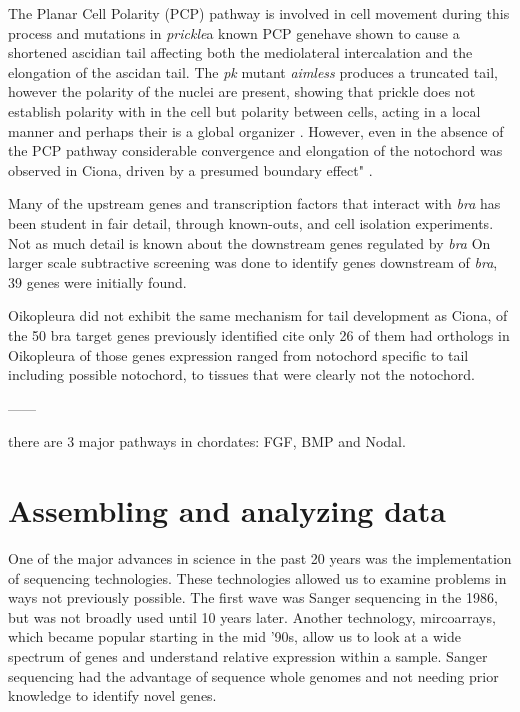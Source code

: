 The Planar Cell Polarity (PCP) pathway is involved in cell movement during this process and mutations in \textit{prickle}\textemdash a known PCP gene\textemdash have shown to cause a shortened ascidian tail affecting both the mediolateral intercalation and the elongation of the ascidan tail\cite{jiang_ascidian_2005}. The \textit{pk} mutant \textit{aimless} produces a truncated tail, however the polarity of the nuclei are present, showing that prickle does not establish polarity with in the cell but polarity between cells, acting in a local manner and perhaps their is a global organizer \cite{jiang_ascidian_2005,kourakis_one-dimensional_2014}. However, even in the absence of the PCP pathway considerable convergence and elongation of the notochord was observed in Ciona, driven by a presumed boundary effect" \cite{veeman_chongmague_2008}.

Many of the upstream genes and transcription factors that interact with \textit{bra} has been student in fair detail, through known-outs, and cell isolation experiments. Not as much detail is known about the downstream genes regulated by \textit{bra} On larger scale subtractive screening was done to identify genes downstream of \textit{bra}, 39 genes were initially found.

Oikopleura did not exhibit the same mechanism for tail development as Ciona, of the 50 bra target genes previously identified cite only 26 of them had orthologs in Oikopleura \cite{kugler_evolutionary_2011} of those genes expression ranged from notochord specific to tail including possible notochord, to tissues that were clearly not the notochord.

------


there are 3 major pathways in chordates: FGF, BMP and Nodal.


\section{Assembling and analyzing data}
One of the major advances in science in the past 20 years was the implementation of sequencing technologies. These technologies allowed us to examine problems in ways not previously possible. The first wave was Sanger sequencing in the 1986, but was not broadly used until 10 years later. Another technology, mircoarrays, which became popular starting in the mid '90s, allow us to look at a wide spectrum of genes and understand relative expression within a sample. Sanger sequencing had the advantage of sequence whole genomes and not needing prior knowledge to identify novel genes.

